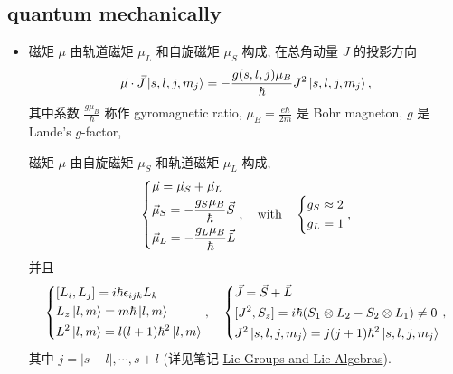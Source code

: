 \subsection{quantum mechanically}
\begin{itemize}
	\item 磁矩 $\mu$ 由轨道磁矩 $\mu_L$ 和自旋磁矩 $\mu_S$ 构成, 在总角动量 $J$ 的投影方向
	\begin{equation}
		\vec{\mu} \cdot \vec{J} \ket{s, l, j, m_j} = - \frac{g(s, l, j) \mu_B}{\hbar} J^2 \ket{s, l, j, m_j},
	\end{equation}
	其中系数 $\frac{g \mu_B}{\hbar}$ 称作 gyromagnetic ratio, $\mu_B = \frac{e \hbar}{2 m}$ 是 Bohr magneton, $g$ 是 Lande's $g$-factor, 
	
	\begin{tcolorbox}[title=calculation:]
		磁矩 $\mu$ 由自旋磁矩 $\mu_S$ 和轨道磁矩 $\mu_L$ 构成,
		\begin{equation}
			\begin{dcases}
				\vec{\mu} = \vec{\mu}_S + \vec{\mu}_L \\
				\vec{\mu}_S = - \frac{g_S \mu_B}{\hbar} \vec{S} \\
				\vec{\mu}_L = - \frac{g_L \mu_B}{\hbar} \vec{L}
			\end{dcases}, \quad \text{with} \quad \begin{dcases}
			g_S \approx 2 \\
			g_L = 1
			\end{dcases},
		\end{equation}
		并且
		\begin{equation}
			\begin{dcases}
				[L_i, L_j] = i \hbar \epsilon_{i j k} L_k \\
				L_z \ket{l, m} = m \hbar \ket{l, m} \\
				L^2 \ket{l, m} = l (l + 1) \hbar^2 \ket{l, m}
			\end{dcases}, \quad \begin{dcases}
				\vec{J} = \vec{S} + \vec{L} \\
				[J^2, S_z] = i \hbar (S_1 \otimes L_2 - S_2 \otimes L_1) \neq 0 \\
				J^2 \ket{s, l, j, m_j} = j (j + 1) \hbar^2 \ket{s, l, j, m_j}
			\end{dcases},
		\end{equation}
		其中 $j = |s - l|, \cdots, s + l$ (详见笔记 \href{https://github.com/siyang03/my-note---Lie-Groups-and-Lie-Algebras}{Lie Groups and Lie Algebras}).
		

\end{tcolorbox}
\end{itemize}
